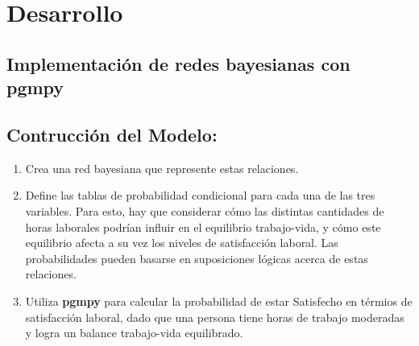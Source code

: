 \section{Desarrollo}


\subsection{Implementación de redes bayesianas con pgmpy}


\subsection{Contrucción del Modelo:}

\begin{enumerate}
    \item Crea una red bayesiana que represente estas relaciones.
    \item Define las tablas de probabilidad condicional para cada una de las tres
    variables. Para esto, hay que considerar cómo las distintas cantidades de horas
    laborales podrían influir en el equilibrio trabajo-vida, y cómo este equilibrio
    afecta a su vez los niveles de satisfacción laboral. Las probabilidades pueden
    basarse en suposiciones lógicas acerca de estas relaciones.
    \item Utiliza \textbf{pgmpy} para calcular la probabilidad de estar Satisfecho en
    térmios de satisfacción laboral, dado que una persona tiene horas de trabajo
    moderadas y logra un balance trabajo-vida equilibrado.
\end{enumerate}